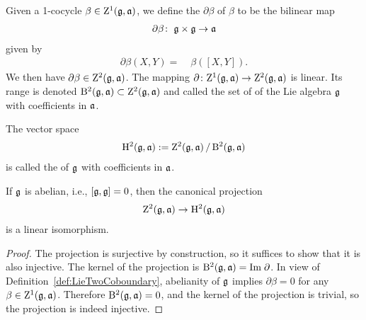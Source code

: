 \begin{definition}
  \label{def:LieTwoCoboundary}
  \leanok
  Given a 1-cocycle $\beta \in \mathrm{Z}^1(\mathfrak{g}, \mathfrak{a})$, we define the
   $\partial \beta$ of $\beta$ to be the bilinear map
  \begin{align*}
    \partial \beta \colon \; & \mathfrak{g} \times \mathfrak{g} \to \mathfrak{a} \\
  \end{align*}
  given by
  \begin{align*}
    \partial \beta (X, Y) = \; & \beta ([X,Y]) .
  \end{align*}
  We then have $\partial \beta \in \mathrm{Z}^2(\mathfrak{g},\mathfrak{a})$.
  The mapping $\partial \colon \mathrm{Z}^1(\mathfrak{g},\mathfrak{a}) \to \mathrm{Z}^2(\mathfrak{g},\mathfrak{a})$
  is linear. Its range is denoted $\mathrm{B}^2(\mathfrak{g},\mathfrak{a}) \subset \mathrm{Z}^2(\mathfrak{g},\mathfrak{a})$
  and called the set of  of the Lie algebra $\mathfrak{g}$
  with coefficients in $\mathfrak{a}$.
\end{definition}

\begin{definition}
  \label{def:LieTwoCohomology}
  \leanok
  The vector space
  \begin{align*}
    \mathrm{H}^2(\mathfrak{g},\mathfrak{a}) := \mathrm{Z}^2(\mathfrak{g},\mathfrak{a}) \, / \, \mathrm{B}^2(\mathfrak{g},\mathfrak{a})
  \end{align*}
  is called the  of $\mathfrak{g}$
  with coefficients in $\mathfrak{a}$.
\end{definition}

\begin{lemma}
  \label{lem:LieTwoCohomology_abelian}
  \leanok
  If $\mathfrak{g}$ is abelian, i.e., $[\mathfrak{g},\mathfrak{g}] = 0$, then
  the canonical projection
  \begin{align*}
    \mathrm{Z}^2(\mathfrak{g},\mathfrak{a}) \to \mathrm{H}^2(\mathfrak{g},\mathfrak{a})
  \end{align*}
  is a linear isomorphism.
\end{lemma}
\begin{proof}
  \leanok
  The projection is surjective by construction, so it suffices to show that it is also injective.
  The kernel of the projection is $\mathrm{B}^2(\mathfrak{g},\mathfrak{a}) = \mathrm{Im} \; \partial$.
  In view of Definition~\ref{def:LieTwoCoboundary},
  abelianity of $\mathfrak{g}$ implies $\partial \beta = 0$ for any $\beta \in \mathrm{Z}^1(\mathfrak{g},\mathfrak{a})$.
  Therefore $\mathrm{B}^2(\mathfrak{g},\mathfrak{a}) = 0$, and the kernel of the projection is trivial,
  so the projection is indeed injective.
\end{proof}
